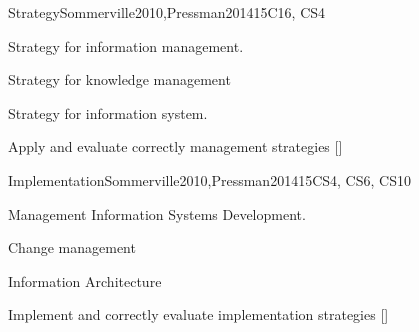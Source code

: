 \begin{syllabus}
	\begin{unit}{Strategy}{}{Sommerville2010,Pressman2014}{15}{C16, CS4}
		\begin{topics}
			\item Strategy for information management.
			\item Strategy for knowledge management
			\item Strategy for information system.
		\end{topics}
		\begin{learningoutcomes}
			\item Apply and evaluate correctly management strategies [\Assessment]
		\end{learningoutcomes}
	\end{unit}

	\begin{unit}{Implementation}{}{Sommerville2010,Pressman2014}{15}{CS4, CS6, CS10}
		\begin{topics}
			\item Management Information Systems Development.
			\item Change management
			\item Information Architecture
		\end{topics}
		\begin{learningoutcomes}
			\item Implement and correctly evaluate implementation strategies [\Assessment]
		\end{learningoutcomes}
	\end{unit}

	\begin{coursebibliography}
	\end{coursebibliography}

\end{syllabus}
